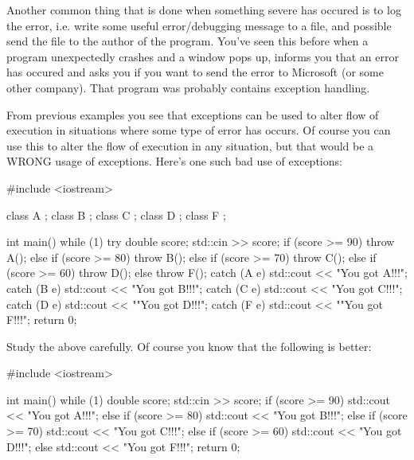 Another common thing that is done when something severe has occured is
to log the error, i.e. write some useful error/debugging message to a
file, and possible send the file to the author of the program.
You've seen this before when a program unexpectedly
crashes and a window pops up, informs you that an error has occured and
asks you if you want to send the error to Microsoft (or some other
company). That program was probably contains exception handling.

\newpage{}

From previous examples you see that exceptions can be used to alter flow
of execution in situations where some type of error has occurs. Of
course you can use this to alter the flow of execution in any situation,
but that would be a WRONG usage of exceptions. Here's
one such bad use of exceptions:

\begin{console}
#include <iostream>

class A {};
class B {};
class C {};
class D {};
class F {};

int main()
{   
    while (1)
    {     
          try
          {
               double score;
               std::cin >> score;
               if (score >= 90)
               {
                    throw A();
               }
               else if (score >= 80)
               {
                    throw B();
               }
               else if (score >= 70)
               {
                    throw C();
               }
               else if (score >= 60)
               {
                    throw D();
               }
               else
               {
                    throw F();
               }
          }
          catch (A e)
          {
               std::cout << "You got A!!!\n";
          }
          catch (B e)
          {
               std::cout << "You got B!!!\n";
          }
          catch (C e)
          {
               std::cout << "You got C!!!\n";
          }
          catch (D e)
          {         
               std::cout << ""You got D!!!\n";
          }
          catch (F e)
          {
               std::cout << ""You got
               F!!!\n";
          }
    }
    return 0;
}
\end{console}

Study the above carefully. Of course you know that the following is
better:

\begin{console}
#include <iostream>

int main()
{   
    while (1)
    {
        double score;
        std::cin >> score;
        if (score >= 90)
        {   
           std::cout << "You got A!!!\n";
        }
        else if (score >= 80)
        {
           std::cout << "You got B!!!\n";
        }
        else if (score >= 70)
        {
           std::cout << "You got C!!!\n";
        }
        else if (score >= 60)
        {
           std::cout << "You got D!!!\n";
        }
        else
        {
           std::cout << "You got F!!!\n";
        }
    }
    return 0;
}
\end{console}

